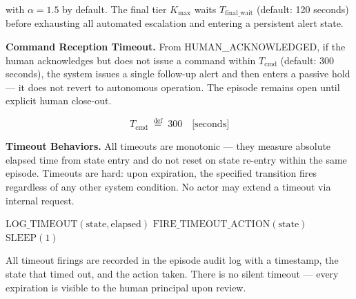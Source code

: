 with $\alpha = 1.5$ by default. The final tier $K_{\text{max}}$ waits $T_{\text{final\_wait}}$ (default: 120 seconds) before exhausting all automated escalation and entering a persistent alert state.

\bigskip

\bigskip

\noindent\textbf{Command Reception Timeout.} From HUMAN\_ACKNOWLEDGED, if the human acknowledges but does not issue a command within $T_{\text{cmd}}$ (default: 300 seconds), the system issues a single follow-up alert and then enters a passive hold — it does not revert to autonomous operation. The episode remains open until explicit human close-out.

\bigskip

\[
T_{\text{cmd}} \;\overset{\text{def}}{=} \; 300 \quad \text{[seconds]}
\]

\bigskip

\bigskip

\noindent\textbf{Timeout Behaviors.} All timeouts are monotonic — they measure absolute elapsed time from state entry and do not reset on state re-entry within the same episode. Timeouts are hard: upon expiration, the specified transition fires regardless of any other system condition. No actor may extend a timeout via internal request.

\bigskip

\begin{algorithm}
\caption{Timeout Monitor}
\begin{algorithmic}[1]
\Statex {}
                \State $\text{LOG\_TIMEOUT}(\text{state}, \text{elapsed})$
                \State $\text{FIRE\_TIMEOUT\_ACTION}(\text{state})$
            \EndIf
        \EndFor
        \State $\text{SLEEP}(1)$
    \EndWhile
\EndFunction
\end{algorithmic}
\end{algorithm}

\bigskip

\bigskip

All timeout firings are recorded in the episode audit log with a timestamp, the state that timed out, and the action taken. There is no silent timeout — every expiration is visible to the human principal upon review.

